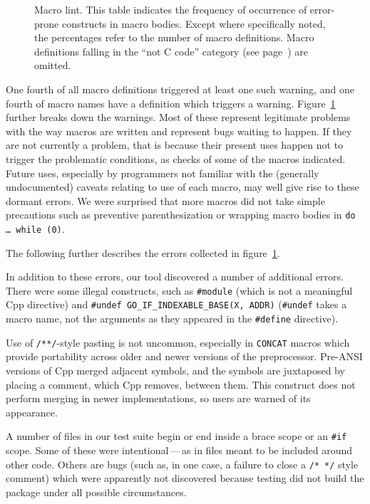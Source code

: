 \documentclass[10pt]{article}
\begin{document}
\begin{figure}
  {\small\centerline{}}
  
  \caption{Macro lint.  This table indicates the frequency of occurrence of
    error-prone constructs in macro bodies.  Except where specifically
    noted, the percentages refer to the number of macro definitions.  Macro
    definitions falling in the ``not C code'' category (see
    page~\pageref{page:not-c-code}) are omitted.}
  \label{fig:macro-lint}
\end{figure}

One fourth of all macro definitions triggered at least one such warning,
and one fourth of macro names have a definition which triggers a warning.
Figure~\ref{fig:macro-lint} further breaks down the warnings.  Most of
these represent legitimate problems with the way macros are written and
represent bugs waiting to happen.  If they are not currently a problem,
that is because their present uses happen not to trigger the problematic
conditions, as checks of some of the macros indicated.  Future uses,
especially by programmers not familiar with the (generally undocumented)
caveats relating to use of each macro, may well give rise to these dormant
errors.  We were surprised that more macros did not take simple precautions
such as preventive parenthesization or wrapping macro bodies in {\tt do
{\rm \ldots} while (0)}.

The following further describes the errors collected in
figure~\ref{fig:macro-lint}.

{}

In addition to these errors, our tool discovered a number of additional
errors.  There were some illegal constructs, such as {\tt \#module} (which
is not a meaningful Cpp directive) and {\tt \#undef
\verb|GO_IF_INDEXABLE_BASE|(X, ADDR)} ({\tt \#undef} takes a macro name,
not the arguments as they appeared in the {\tt \#define} directive).
  
Use of {\tt /**/}-style pasting is not uncommon, especially in {\tt CONCAT}
macros which provide portability across older and newer versions of the
preprocessor.  Pre-ANSI versions of Cpp merged adjacent symbols, and the
symbols are juxtaposed by placing a comment, which Cpp removes, between
them.  This construct does not perform merging in newer implementations,
so users are warned of its appearance.

A number of files in our test suite begin or end inside a brace scope or an
{\tt \#if} scope.  Some of these were intentional\,---\,as in files meant
to be included around other code.  Others are bugs (such as, in one case, a
failure to close a {\tt /* */} style comment) which were apparently not
discovered because testing did not build the package under all possible
circumstances.
\end{document}
